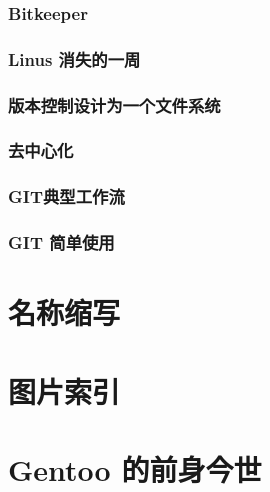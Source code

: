 \documentclass[amstex]{ctexbook}
\begin{document}
\subsection{  Bitkeeper	}
\subsection{  Linus 消失的一周	}
\subsection{  版本控制设计为一个文件系统	}
\subsection{ 去中心化	}
\subsection{  GIT典型工作流	}
\subsection{  GIT 简单使用	}


\appendix
\renewcommand{\thesection}{\arabic{section}}



\chapter{ 名称缩写	}
\chapter{ 图片索引	}
\chapter{ Gentoo 的前身今世}
\end{document}
